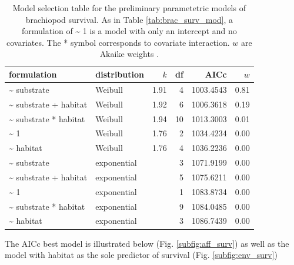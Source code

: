 \documentclass[12pt,letterpaper]{article}
\begin{document}
\begin{table}[ht]
  \centering
  \begin{tabular}{llrrrr}
    \hline
    formulation & distribution & \(k\) & df & AICc & \(w\) \\ 
    \hline
    \~{} substrate & Weibull & 1.91 & 4 & 1003.4543 & 0.81 \\ 
    \~{} substrate + habitat & Weibull & 1.92 & 6 & 1006.3618 & 0.19 \\ 
    \~{} substrate * habitat & Weibull & 1.94 & 10 & 1013.3003 & 0.01 \\ 
    \~{} 1 & Weibull & 1.76 & 2 & 1034.4234 & 0.00 \\ 
    \~{} habitat & Weibull & 1.76 & 4 & 1036.2236 & 0.00 \\ 
    \~{} substrate & exponential &  & 3 & 1071.9199 & 0.00 \\ 
    \~{} substrate + habitat & exponential &  & 5 & 1075.6211 & 0.00 \\ 
    \~{} 1 & exponential &  & 1 & 1083.8734 & 0.00 \\ 
    \~{} substrate * habitat & exponential &  & 9 & 1084.0485 & 0.00 \\ 
    \~{} habitat & exponential &  & 3 & 1086.7439 & 0.00 \\ 
    \hline
  \end{tabular}
  \caption[Brachiopod survival models]{Model selection table for the preliminary parametetric models of brachiopod survival. As in Table \ref{tab:brac_surv_mod}, a formulation of \~{} 1 is a model with only an intercept and no covariates. The * symbol corresponds to covariate interaction. \(w\) are Akaike weights \citep{Burnham2002a}.}
  \label{tab:bracmod}
\end{table}

The AICc best model is illustrated below (Fig. \ref{subfig:aff_surv}) as well as the model with habitat as the sole predictor of survival (Fig. \ref{subfig:env_surv})
\end{document}

